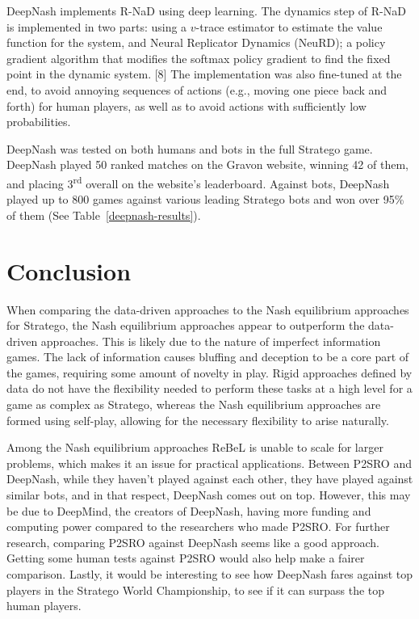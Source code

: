 \documentclass{article}
\begin{document}
DeepNash implements R-NaD using deep learning. The dynamics step of R-NaD is implemented in two parts: using a $v$-trace estimator to estimate the value function for the system, and Neural Replicator Dynamics (NeuRD); 
a policy gradient algorithm that modifies the softmax policy gradient to find the fixed point in the dynamic system. [8] 
The implementation was also fine-tuned at the end, to avoid annoying sequences of actions (e.g., moving one piece back and forth) for human players, as well as to avoid actions with sufficiently low probabilities. 

DeepNash was tested on both humans and bots in the full Stratego game. DeepNash played 50 ranked matches on the Gravon website, winning 42 of them, and placing 3\textsuperscript{rd} overall on the website's leaderboard. 
Against bots, DeepNash played up to 800 games against various leading Stratego bots and won over 95\% of them (See Table~\ref{deepnash-results}). 

\section{Conclusion}
When comparing the data-driven approaches to the Nash equilibrium approaches for Stratego, the Nash equilibrium approaches appear to outperform the data-driven approaches. 
This is likely due to the nature of imperfect information games. The lack of information causes bluffing and deception to be a core part of the games, requiring some amount of novelty in play. 
Rigid approaches defined by data do not have the flexibility needed to perform these tasks at a high level for a game as complex as Stratego, whereas the Nash equilibrium approaches are formed using self-play, allowing for the necessary flexibility to arise naturally. 

Among the Nash equilibrium approaches ReBeL is unable to scale for larger problems, which makes it an issue for practical applications.  
Between P2SRO and DeepNash, while they haven’t played against each other, they have played against similar bots, and in that respect, DeepNash comes out on top. 
However, this may be due to DeepMind, the creators of DeepNash, having more funding and computing power compared to the researchers who made P2SRO. 
For further research, comparing P2SRO against DeepNash seems like a good approach. Getting some human tests against P2SRO would also help make a fairer comparison. 
Lastly, it would be interesting to see how DeepNash fares against top players in the Stratego World Championship, to see if it can surpass the top human players. 
\end{document}
